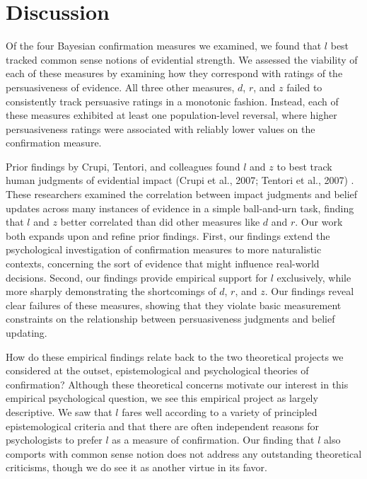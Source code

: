 \documentclass[10pt, letterpaper]{article}
\begin{document}
\hypertarget{discussion}{%
\section{Discussion}\label{discussion}}

Of the four Bayesian confirmation measures we examined, we found that
\(l\) best tracked common sense notions of evidential strength. We
assessed the viability of each of these measures by examining how they
correspond with ratings of the persuasiveness of evidence. All three
other measures, \(d\), \(r\), and \(z\) failed to consistently track
persuasive ratings in a monotonic fashion. Instead, each of these
measures exhibited at least one population-level reversal, where higher
persuasiveness ratings were associated with reliably lower values on the
confirmation measure.

Prior findings by Crupi, Tentori, and colleagues found \(l\) and \(z\)
to best track human judgments of evidential impact (Crupi et al., 2007;
Tentori et al., 2007) . These researchers examined the correlation
between impact judgments and belief updates across many instances of
evidence in a simple ball-and-urn task, finding that \(l\) and \(z\)
better correlated than did other measures like \(d\) and \(r\). Our work
both expands upon and refine prior findings. First, our findings extend
the psychological investigation of confirmation measures to more
naturalistic contexts, concerning the sort of evidence that might
influence real-world decisions. Second, our findings provide empirical
support for \(l\) exclusively, while more sharply demonstrating the
shortcomings of \(d\), \(r\), and \(z\). Our findings reveal clear
failures of these measures, showing that they violate basic measurement
constraints on the relationship between persuasiveness judgments and
belief updating.

How do these empirical findings relate back to the two theoretical
projects we considered at the outset, epistemological and psychological
theories of confirmation? Although these theoretical concerns motivate
our interest in this empirical psychological question, we see this
empirical project as largely descriptive. We saw that \(l\) fares well
according to a variety of principled epistemological criteria and that
there are often independent reasons for psychologists to prefer \(l\) as
a measure of confirmation. Our finding that \(l\) also comports with
common sense notion does not address any outstanding theoretical
criticisms, though we do see it as another virtue in its favor.
\end{document}
